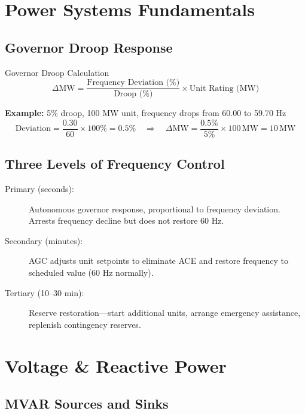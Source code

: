 \documentclass[12pt,twoside,openright]{memoir}
\begin{document}
\chapter{Power Systems Fundamentals}
\label{ch:powersystems}

\section{Governor Droop Response}

\begin{formulabox}{Governor Droop Calculation}
\[
\Delta\text{MW} = \frac{\text{Frequency Deviation (\%)}}{\text{Droop (\%)}} \times \text{Unit Rating (MW)}
\]

\textbf{Example:} 5\% droop, 100 MW unit, frequency drops from 60.00 to 59.70 Hz
\[
\text{Deviation} = \frac{0.30}{60} \times 100\% = 0.5\%
\quad\Rightarrow\quad
\Delta\text{MW} = \frac{0.5\%}{5\%} \times 100\,\text{MW} = 10\,\text{MW}
\]
\end{formulabox}

\section{Three Levels of Frequency Control}

\begin{description}
  \item[Primary (seconds):] Autonomous governor response, proportional to frequency
        deviation. Arrests frequency decline but does not restore 60 Hz.
  \item[Secondary (minutes):] AGC adjusts unit setpoints to eliminate ACE and restore
        frequency to scheduled value (60 Hz normally).
  \item[Tertiary (10--30 min):] Reserve restoration—start additional units, arrange
        emergency assistance, replenish contingency reserves.
\end{description}

\chapter{Voltage \& Reactive Power}
\label{ch:var}

\section{MVAR Sources and Sinks}
\end{document}
